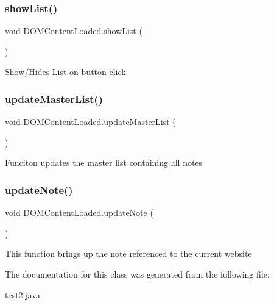 \subsubsection{\texorpdfstring{show\+List()}{showList()}}
{\footnotesize\ttfamily void D\+O\+M\+Content\+Loaded.\+show\+List (\begin{DoxyParamCaption}{ }\end{DoxyParamCaption})\hspace{0.3cm}{\ttfamily [inline]}}

Show/\+Hides List on button click \mbox{\label{class_d_o_m_content_loaded_a6773451115f563a93a7d52016971004d}} 
\subsubsection{\texorpdfstring{update\+Master\+List()}{updateMasterList()}}
{\footnotesize\ttfamily void D\+O\+M\+Content\+Loaded.\+update\+Master\+List (\begin{DoxyParamCaption}{ }\end{DoxyParamCaption})\hspace{0.3cm}{\ttfamily [inline]}}

Funciton updates the master list containing all notes \mbox{\label{class_d_o_m_content_loaded_a5a228b78a1c8a952b3304f9ec596a026}} 
\subsubsection{\texorpdfstring{update\+Note()}{updateNote()}}
{\footnotesize\ttfamily void D\+O\+M\+Content\+Loaded.\+update\+Note (\begin{DoxyParamCaption}{ }\end{DoxyParamCaption})\hspace{0.3cm}{\ttfamily [inline]}}

This function brings up the note referenced to the current website 

The documentation for this class was generated from the following file\+:\begin{DoxyCompactItemize}
\item 
test2.\+java\end{DoxyCompactItemize}
